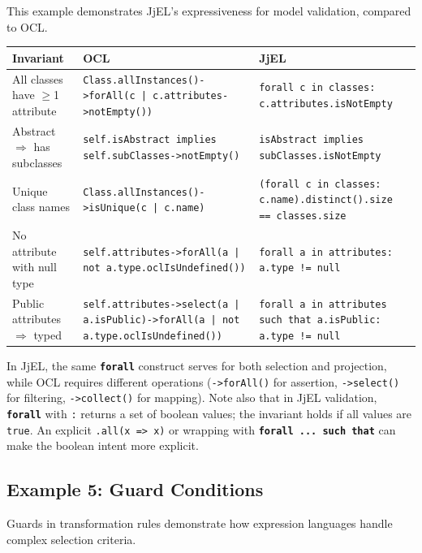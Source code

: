\documentclass[11pt,a4paper]{article}
\newcommand{\jjel}{\textsf{JjEL}}
\newcommand{\kw}[1]{\texttt{\textbf{#1}}}
\begin{document}
This example demonstrates \jjel{}'s expressiveness for model validation, compared to OCL.

\begin{center}
\small
\begin{tabularx}{\textwidth}{@{}p{3.5cm}XX@{}}
\toprule
\textbf{Invariant} & \textbf{OCL} & \textbf{JjEL} \\
\midrule
All classes have $\geq$1 attribute &
\texttt{Class.allInstances()->forAll(c | c.attributes->notEmpty())} &
\texttt{forall c in classes: c.attributes.isNotEmpty} \\
\addlinespace
Abstract $\Rightarrow$ has subclasses &
\texttt{self.isAbstract implies self.subClasses->notEmpty()} &
\texttt{isAbstract implies subClasses.isNotEmpty} \\
\addlinespace
Unique class names &
\texttt{Class.allInstances()->isUnique(c | c.name)} &
\texttt{(forall c in classes: c.name).distinct().size == classes.size} \\
\addlinespace
No attribute with null type &
\texttt{self.attributes->forAll(a | not a.type.oclIsUndefined())} &
\texttt{forall a in attributes: a.type != null} \\
\addlinespace
Public attributes $\Rightarrow$ typed &
\texttt{self.attributes->select(a | a.isPublic)->forAll(a | not a.type.oclIsUndefined())} &
\texttt{forall a in attributes such that a.isPublic: a.type != null} \\
\bottomrule
\end{tabularx}
\end{center}

In \jjel{}, the same \kw{forall} construct serves for both selection and projection, while OCL requires different operations (\texttt{->forAll()} for assertion, \texttt{->select()} for filtering, \texttt{->collect()} for mapping). Note also that in \jjel{} validation, \kw{forall} with \texttt{:} returns a set of boolean values; the invariant holds if all values are \texttt{true}. An explicit \texttt{.all(x => x)} or wrapping with \kw{forall ... such that} can make the boolean intent more explicit.


\subsection{Example 5: Guard Conditions}

Guards in transformation rules demonstrate how expression languages handle complex selection criteria.
\end{document}
